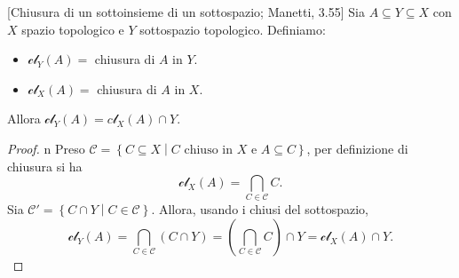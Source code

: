 \begin{lemma}{}[Chiusura di un sottoinsieme di un sottospazio; Manetti, 3.55]
Sia $A\subseteq Y\subseteq X$ con $X$ spazio topologico e $Y$ sottospazio topologico. Definiamo:
\begin{itemize}
\item $\mathcal{cl}_Y\left(A\right)=$ chiusura di $A$ in $Y$.
\item $\mathcal{cl}_X\left(A\right)=$ chiusura di $A$ in $X$.
\end{itemize}
Allora $\mathcal{cl}_Y\left(A\right)=c\mathcal{l}_X\left(A\right)\cap Y$.
\end{lemma}
\begin{proof}{n}
Preso $\mathcal{C}=\left\{C\subseteq X\middle| C\text{ chiuso in }X\text{ e } A\subseteq C\right\}$, per definizione di chiusura si ha
\begin{equation*}
\mathcal{cl}_X\left(A\right)=\bigcap_{C\in\mathcal{C}}C.
\end{equation*}
Sia $\mathcal{C}'=\left\{C\cap Y\middle| C\in\mathcal{C}\right\}$. Allora, usando i chiusi del sottospazio,
\begin{equation*}
\mathcal{cl}_Y\left(A\right)=\bigcap_{C\in\mathcal{C}}\left(C\cap Y\right)=\left(\bigcap_{C\in\mathcal{C}}C\right)\cap Y=\mathcal{cl}_X\left(A\right)\cap Y.
\end{equation*}
\end{proof}

